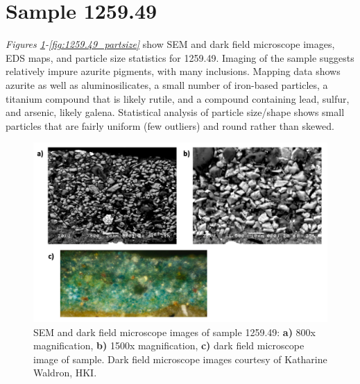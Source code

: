 \section{Sample 1259.49}

\textit{Figures \ref{fig:1259.49_imgs}-\ref{fig:1259.49_partsize}} show SEM and dark field microscope images, EDS maps, and particle size statistics for 1259.49. Imaging of the sample suggests relatively impure azurite pigments, with many inclusions. Mapping data shows azurite as well as aluminosilicates, a small number of iron-based particles, a titanium compound that is likely rutile, and a compound containing lead, sulfur, and arsenic, likely galena. Statistical analysis of particle size/shape shows small particles that are fairly uniform (few outliers) and round rather than skewed.

\begin{figure}[H]
  \centering
  \includegraphics[width=0.8\linewidth]{1259.49_imgs}
\caption[SEM and dark field microscope images of sample 1259.49.]{SEM and dark field microscope images of sample 1259.49: \textbf{a)} 800x magnification, \textbf{b)} 1500x magnification, \textbf{c)} dark field microscope image of sample. Dark field microscope images courtesy of Katharine Waldron, HKI.}
\label{fig:1259.49_imgs}
\end{figure}

